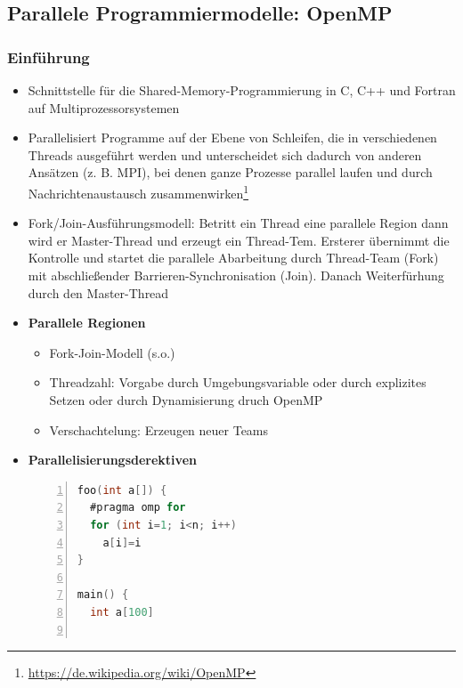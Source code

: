 \subsection{Parallele Programmiermodelle: OpenMP}

\subsubsection{Einführung}
\begin{itemize}
	\item Schnittstelle für die Shared-Memory-Programmierung in C, C++ und Fortran auf Multiprozessorsystemen
	\item Parallelisiert Programme auf der Ebene von Schleifen, die in verschiedenen Threads ausgeführt werden und unterscheidet sich dadurch von anderen Ansätzen (z. B. MPI), bei denen ganze Prozesse parallel laufen und durch Nachrichtenaustausch zusammenwirken\footnote{\url{https://de.wikipedia.org/wiki/OpenMP}}
	\item Fork/Join-Ausführungsmodell: Betritt ein Thread eine parallele Region dann wird er Master-Thread und erzeugt ein Thread-Tem. Ersterer  übernimmt die Kontrolle und startet die parallele Abarbeitung durch Thread-Team (Fork) mit abschließender Barrieren-Synchronisation (Join). Danach Weiterfürhung durch den Master-Thread
	\item \textbf{Parallele Regionen}
	\begin{itemize}
		\item Fork-Join-Modell (s.o.)
		\item Threadzahl: Vorgabe durch Umgebungsvariable oder durch explizites Setzen oder durch Dynamisierung druch OpenMP
		\item Verschachtelung: Erzeugen neuer Teams
	\end{itemize}
	\item \textbf{Parallelisierungsderektiven}
	\begin{lstlisting}[frame=single,numbers=left,mathescape,language=C]
foo(int a[]) {
  #pragma omp for
  for (int i=1; i<n; i++)
    a[i]=i
}

main() {
  int a[100]


\end{lstlisting}
\end{itemize}
